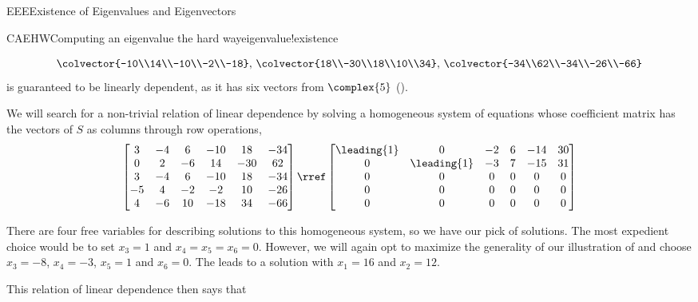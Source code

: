\begin{subsect}{EEE}{Existence of Eigenvalues and Eigenvectors}
\begin{example}{CAEHW}{Computing an eigenvalue the hard way}{eigenvalue!existence}
\begin{para}
\begin{align*}
{\colvector{-10\\14\\-10\\-2\\-18},\,
\colvector{18\\-30\\18\\10\\34},\,
\colvector{-34\\62\\-34\\-26\\-66}
}
\end{align*}
%
is guaranteed to be linearly dependent, as it has six vectors from $\complex{5}$ ().\end{para}
%
\begin{para}We will search for a non-trivial relation of linear dependence by solving a homogeneous system of equations whose coefficient matrix has the vectors of $S$ as columns through row operations,
%
\begin{equation*}
\begin{bmatrix}
3 & -4 & 6 & -10 & 18 & -34\\
0 & 2 & -6 & 14 & -30 & 62\\
3 & -4 & 6 & -10 & 18 & -34\\
-5 & 4 & -2 & -2 & 10 & -26\\
4 & -6 & 10 & -18 & 34 & -66
\end{bmatrix}
\rref
\begin{bmatrix}
\leading{1} & 0 & -2 & 6 & -14 & 30\\
0 & \leading{1} & -3 & 7 & -15 & 31\\
0 & 0 & 0 & 0 & 0 & 0\\
0 & 0 & 0 & 0 & 0 & 0\\
0 & 0 & 0 & 0 & 0 & 0
\end{bmatrix}
\end{equation*}
\end{para}
%
\begin{para}There are four free variables for describing solutions to this homogeneous system, so we have our pick of solutions.  The most expedient choice would be to set $x_3=1$ and $x_4=x_5=x_6=0$.  However, we will again opt to maximize the generality of our illustration of  and choose $x_3=-8$, $x_4=-3$, $x_5=1$ and $x_6=0$.  The leads to a solution with $x_1=16$ and $x_2=12$.\end{para}
%
\begin{para}This relation of linear dependence then says that

\end{para}
\end{example}
\end{subsect}
